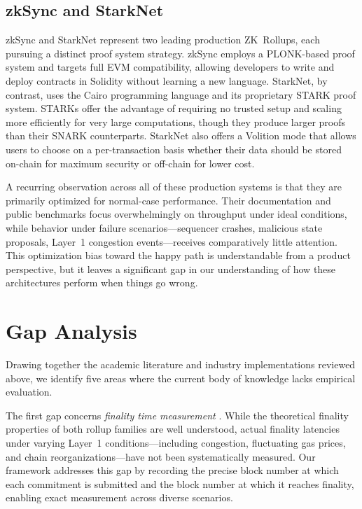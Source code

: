 \subsection{zkSync and StarkNet}

zkSync and StarkNet represent two leading production ZK~Rollups, each pursuing a distinct proof system strategy. zkSync employs a PLONK-based proof system and targets full EVM compatibility, allowing developers to write and deploy contracts in Solidity without learning a new language. StarkNet, by contrast, uses the Cairo programming language and its proprietary STARK proof system. STARKs offer the advantage of requiring no trusted setup and scaling more efficiently for very large computations, though they produce larger proofs than their SNARK counterparts. StarkNet also offers a Volition mode that allows users to choose on a per-transaction basis whether their data should be stored on-chain for maximum security or off-chain for lower cost.

A recurring observation across all of these production systems is that they are primarily optimized for normal-case performance. Their documentation and public benchmarks focus overwhelmingly on throughput under ideal conditions, while behavior under failure scenarios---sequencer crashes, malicious state proposals, Layer~1 congestion events---receives comparatively little attention. This optimization bias toward the happy path is understandable from a product perspective, but it leaves a significant gap in our understanding of how these architectures perform when things go wrong.

\section{Gap Analysis}

Drawing together the academic literature and industry implementations reviewed above, we identify five areas where the current body of knowledge lacks empirical evaluation.

The first gap concerns \textit{finality time measurement} \label{gap:finality}. While the theoretical finality properties of both rollup families are well understood, actual finality latencies under varying Layer~1 conditions---including congestion, fluctuating gas prices, and chain reorganizations---have not been systematically measured. Our framework addresses this gap by recording the precise block number at which each commitment is submitted and the block number at which it reaches finality, enabling exact measurement across diverse scenarios.

